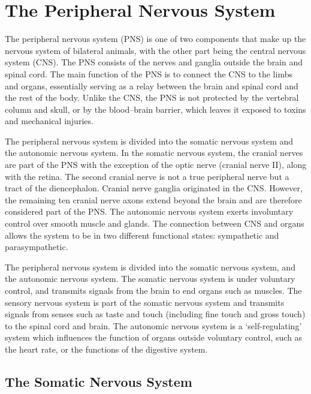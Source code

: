 \hypertarget{the-peripheral-nervous-system}{%
\chapter{The Peripheral Nervous System}\label{the-peripheral-nervous-system}}

The peripheral nervous system (PNS) is one of two components that make up the nervous system of bilateral animals, with the other part being the central nervous system (CNS). The PNS consists of the nerves and ganglia outside the brain and spinal cord. The main function of the PNS is to connect the CNS to the limbs and organs, essentially serving as a relay between the brain and spinal cord and the rest of the body. Unlike the CNS, the PNS is not protected by the vertebral column and skull, or by the blood--brain barrier, which leaves it exposed to toxins and mechanical injuries.

The peripheral nervous system is divided into the somatic nervous system and the autonomic nervous system. In the somatic nervous system, the cranial nerves are part of the PNS with the exception of the optic nerve (cranial nerve II), along with the retina. The second cranial nerve is not a true peripheral nerve but a tract of the diencephalon. Cranial nerve ganglia originated in the CNS. However, the remaining ten cranial nerve axons extend beyond the brain and are therefore considered part of the PNS. The autonomic nervous system exerts involuntary control over smooth muscle and glands. The connection between CNS and organs allows the system to be in two different functional states: sympathetic and parasympathetic.

The peripheral nervous system is divided into the somatic nervous system, and the autonomic nervous system. The somatic nervous system is under voluntary control, and transmits signals from the brain to end organs such as muscles. The sensory nervous system is part of the somatic nervous system and transmits signals from senses such as taste and touch (including fine touch and gross touch) to the spinal cord and brain. The autonomic nervous system is a `self-regulating' system which influences the function of organs outside voluntary control, such as the heart rate, or the functions of the digestive system.

\hypertarget{the-somatic-nervous-system}{%
\section{The Somatic Nervous System}\label{the-somatic-nervous-system}}

